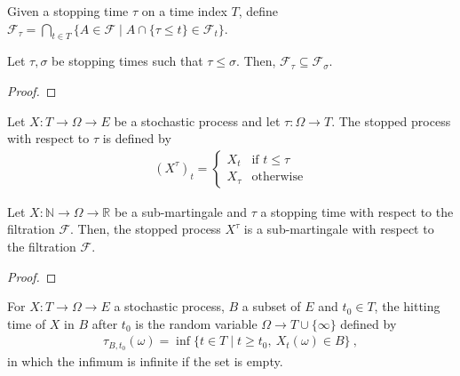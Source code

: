 \begin{definition}\label{def:StoppingTimeGen}
  \mathlibok
  Given a stopping time $\tau$ on a time index $T$, define
  $\mathcal{F}_\tau = \bigcap_{t \in T} \{A \in \mathcal{F} \mid A \cap \{\tau \le t\} \in \mathcal{F}_t\}.$
\end{definition}


\begin{lemma}\label{lem:StoppingTimeGenMono}
  \mathlibok
  Let $\tau, \sigma$ be stopping times such that $\tau \le \sigma$.
  Then, $\mathcal{F}_\tau \subseteq \mathcal{F}_\sigma$.
\end{lemma}

\begin{proof}
\end{proof}


\begin{definition}\label{def:stoppedProcess}
  \mathlibok
Let $X : T \to \Omega \to E$ be a stochastic process and let $\tau : \Omega \to T$.
The stopped process with respect to $\tau$ is defined by
\begin{align*}
  (X^{\tau})_t = \begin{cases}
    X_t & \text{if } t \le \tau \\
    X_{\tau} & \text{otherwise}
  \end{cases}
\end{align*}
\end{definition}


\begin{lemma}\label{lem:Submartingale.stoppedProcess}
  \mathlibok
Let $X : \mathbb{N} \to \Omega \to \mathbb{R}$ be a sub-martingale and $\tau$ a stopping time with respect to the filtration $\mathcal{F}$.
Then, the stopped process $X^{\tau}$ is a sub-martingale with respect to the filtration $\mathcal{F}$.
\end{lemma}

\begin{proof}
\end{proof}


\begin{definition}\label{def:hittingAfter}
  \mathlibok
For $X : T \to \Omega \to E$ a stochastic process, $B$ a subset of $E$ and $t_0 \in T$, the hitting time of $X$ in $B$ after $t_0$ is the random variable $\Omega \to T\cup\{\infty\}$ defined by
\begin{align*}
  \tau_{B, t_0}(\omega) = \inf\{t \in T \mid t \ge t_0, \: X_t(\omega) \in B\} \: ,
\end{align*}
in which the infimum is infinite if the set is empty.
\end{definition}


